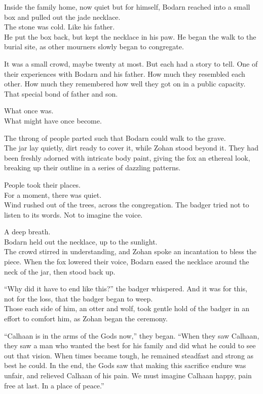 \secdiv

Inside the family home, now quiet but for himself, Bodarn reached into a small box and pulled out the jade necklace.\\
The stone was cold. Like his father.\\
He put the box back, but kept the necklace in his paw. He began the walk to the burial site, as other mourners slowly began to congregate.

It was a small crowd, maybe twenty at most. But each had a story to tell. One of their experiences with Bodarn and his father. How much they resembled each other. How much they remembered how well they got on in a public capacity. That special bond of father and son.

What once was.\\
What might have once become.

The throng of people parted such that Bodarn could walk to the grave.\\
The jar lay quietly, dirt ready to cover it, while Zohan stood beyond it. They had been freshly adorned with intricate body paint, giving the fox an ethereal look, breaking up their outline in a series of dazzling patterns.

People took their places.\\
For a moment, there was quiet.\\
Wind rushed out of the trees, across the congregation. The badger tried not to listen to its words. Not to imagine the voice.

A deep breath.\\
Bodarn held out the necklace, up to the sunlight.\\
The crowd stirred in understanding, and Zohan spoke an incantation to bless the piece. When the fox lowered their voice, Bodarn eased the necklace around the neck of the jar, then stood back up.

``Why did it have to end like this?'' the badger whispered. And it was for this, not for the loss, that the badger began to weep.\\
Those each side of him, an otter and wolf, took gentle hold of the badger in an effort to comfort him, as Zohan began the ceremony.

``Calhaan is in the arms of the Gods now,'' they began. ``When they saw Calhaan, they saw a man who wanted the best for his family and did what he could to see out that vision. When times became tough, he remained steadfast and strong as best he could. In the end, the Gods saw that making this sacrifice endure was unfair, and relieved Calhaan of his pain. We must imagine Calhaan happy, pain free at last. In a place of peace.''

